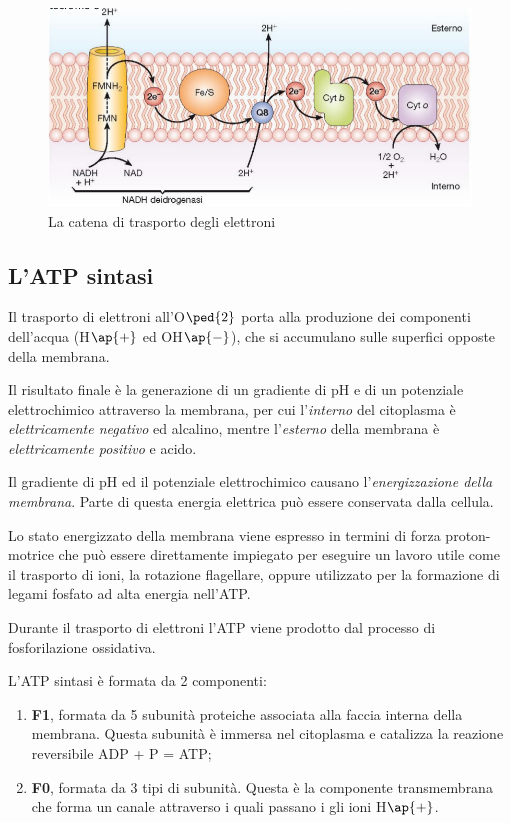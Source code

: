 \documentclass[11pt]{book}
\begin{document}
\clearpage
\begin{figure}[htp]
\centering
\includegraphics[scale=0.5]{img/Catena di trasporto degli elettroni.png}
\caption{La catena di trasporto degli elettroni}
\label{}
\end{figure}

\subsection{L'ATP sintasi}
Il trasporto di elettroni all’O$\ped{2}$ porta alla produzione dei componenti dell’acqua (H$\ap{+}$ ed OH$\ap{-}$), che si accumulano sulle superfici opposte della membrana.

Il risultato finale è la generazione di un gradiente di pH e di un potenziale elettrochimico attraverso la membrana, per cui l’\emph{interno} del citoplasma è \emph{elettricamente negativo} ed alcalino, mentre l’\emph{esterno} della membrana è \emph{elettricamente positivo} e acido.

Il gradiente di pH ed il potenziale elettrochimico causano l’\emph{energizzazione della membrana}. Parte di questa energia elettrica può essere conservata dalla cellula.

\vspace{1em}
Lo stato energizzato della membrana viene espresso in termini di forza proton-motrice che può essere direttamente impiegato per eseguire un lavoro utile come il trasporto di ioni, la rotazione flagellare, oppure utilizzato per la formazione di legami fosfato ad alta energia nell’ATP. 

Durante il trasporto di elettroni l’ATP viene prodotto dal processo di fosforilazione ossidativa.

L’ATP sintasi è formata da 2 componenti:
\begin{enumerate}
\item \textbf{F1}, formata da 5 subunità proteiche associata alla faccia interna della membrana. Questa subunità è immersa nel citoplasma e catalizza la reazione reversibile ADP + P = ATP;
\item \textbf{F0}, formata da 3 tipi di subunità. Questa è la componente transmembrana che forma un canale attraverso i quali passano i gli ioni H$\ap{+}$.
\end{enumerate}
\end{document}
